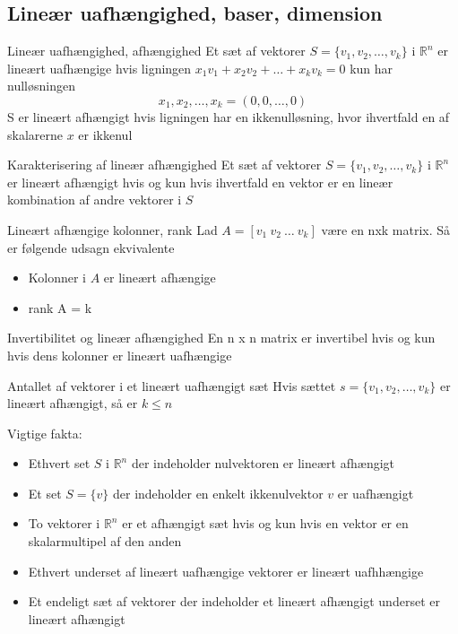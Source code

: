 \documentclass[a4paper,fleqn]{article}
\newcommand{\RR}{\mathbb{R}}
\begin{document}
	\subsection{Lineær uafhængighed, baser, dimension}
	\begin{definition}{Lineær uafhængighed, afhængighed}{}
		Et sæt af vektorer $S = \{ v_1, v_2, \dots, v_k\}$ i $\RR^n$ er lineært uafhængige
		hvis ligningen $x_1 v_1 + x_2 v_2 + \dots + x_k v_k = 0$ kun har nulløsningen
		\[ x_1, x_2, \dots, x_k = (0,0,\dots,0) \]
		S er lineært afhængigt hvis ligningen har en ikkenulløsning, hvor ihvertfald en af
		skalarerne $x$ er ikkenul
	\end{definition}
	\begin{theorem}{Karakterisering af lineær afhængighed}{}
		Et sæt af vektorer $S = \{ v_1, v_2, \dots, v_k\}$ i $\RR^n$ er lineært afhængigt
		hvis og kun hvis ihvertfald en vektor er en lineær kombination af andre vektorer i
		$S$
	\end{theorem}
	\begin{theorem}{Lineært afhængige kolonner, rank}{}
		Lad $A = [v_1\ v_2\ \dots\ v_k]$ være en nxk matrix. Så er følgende udsagn
		ekvivalente
		\begin{itemize}
			\item Kolonner i $A$ er lineært afhængige
			\item rank A = k
		\end{itemize}
	\end{theorem}
	\begin{theorem}{Invertibilitet og lineær afhængighed}{}
		En n x n matrix er invertibel hvis og kun hvis dens kolonner er lineært uafhængige
	\end{theorem}
	\begin{theorem}{Antallet af vektorer i et lineært uafhængigt sæt}{}
		Hvis sættet $s = \{ v_1, v_2, \dots, v_k\}$ er lineært afhængigt, så er $k \leq n$
	\end{theorem}
	Vigtige fakta:
	\begin{itemize}
		\item Ethvert set $S$ i $\RR^n$ der indeholder nulvektoren er lineært afhængigt
		\item Et set $S = \{v\}$ der indeholder en enkelt ikkenulvektor $v$ er uafhængigt
		\item To vektorer i $\RR^n$ er et afhængigt sæt hvis og kun hvis en vektor er 
			en skalarmultipel af den anden
		\item Ethvert underset af lineært uafhængige vektorer er lineært uafhhængige
		\item Et endeligt sæt af vektorer der indeholder et lineært afhængigt underset er
			lineært afhængigt
	\end{itemize}
\end{document}
